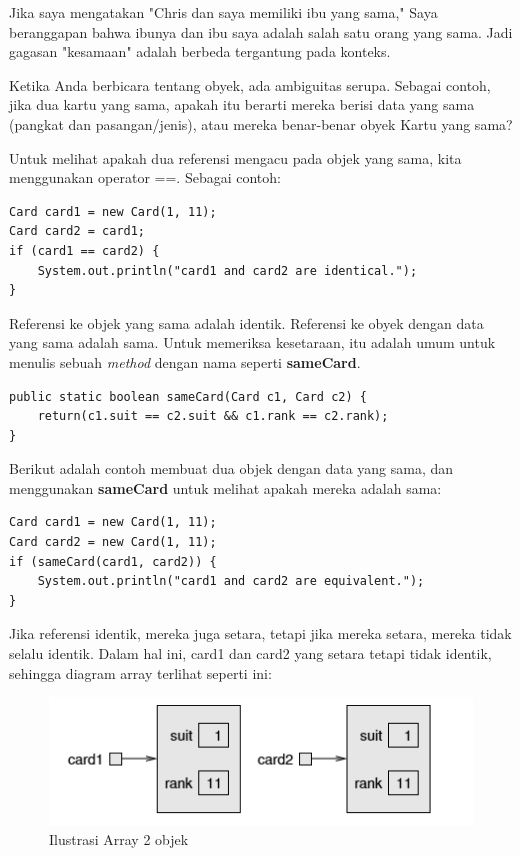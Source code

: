 \documentclass[12pt,b5paper,openright,twoside]{book}
\begin{document}
\noindent Jika saya mengatakan "Chris dan saya memiliki ibu yang sama," Saya beranggapan bahwa ibunya dan ibu saya adalah salah satu orang yang sama. Jadi gagasan "kesamaan" adalah berbeda tergantung pada konteks.

\noindent Ketika Anda berbicara tentang obyek, ada ambiguitas serupa. Sebagai contoh, jika dua kartu yang sama, apakah itu berarti mereka berisi data yang sama (pangkat dan pasangan/jenis), atau mereka benar-benar obyek Kartu yang sama?

\noindent Untuk melihat apakah dua referensi mengacu pada objek yang sama, kita menggunakan operator ==. Sebagai contoh:
\begin{lstlisting}
Card card1 = new Card(1, 11); 
Card card2 = card1;
if (card1 == card2) { 
    System.out.println("card1 and card2 are identical."); 
}
\end{lstlisting}

\noindent Referensi ke objek yang sama adalah identik. Referensi ke obyek dengan data yang sama adalah sama.
Untuk memeriksa kesetaraan, itu adalah umum untuk menulis sebuah \textit{method} dengan nama seperti \textbf{sameCard}.
\begin{lstlisting}
public static boolean sameCard(Card c1, Card c2) { 
    return(c1.suit == c2.suit && c1.rank == c2.rank); 
}
\end{lstlisting}

\noindent Berikut adalah contoh membuat dua objek dengan data yang sama, dan menggunakan \textbf{sameCard} untuk melihat apakah mereka adalah sama:
\begin{lstlisting}
Card card1 = new Card(1, 11); 
Card card2 = new Card(1, 11);
if (sameCard(card1, card2)) { 
    System.out.println("card1 and card2 are equivalent.");
}
\end{lstlisting}

\noindent Jika referensi identik, mereka juga setara, tetapi jika mereka setara, mereka tidak selalu identik.
Dalam hal ini, card1 dan card2 yang setara tetapi tidak identik, sehingga diagram array terlihat seperti ini:
\begin{figure}[h!]
\centering
\includegraphics[scale=0.7]{diagram_array2.png}
\caption{Ilustrasi Array 2 objek}
\label{fig:univerise2}
\end{figure} \par
\end{document}
